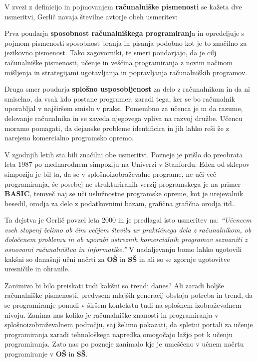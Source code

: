 V zvezi z definicijo in pojmovanjem \textbf{računalniške pismenosti}
se kažeta dve usmeritvi, Gerlič \cite{gerlic_2000} navaja številne
avtorje obeh usmeritev:

Prva poudarja \textbf{sposobnost računalniškega programiranj}a in
opredeljuje s pojmom pismenosti sposobnost branja in pisanja
podobno kot je to značilno za jezikovno pismenost. Tako zagovorniki,
te smeri poudarjajo, da je cilj računalniške pismenosti, učenje in
veščina programiranja z novim načinom mišljenja in strategijami
ugotavljanja in popravljanja računalniških programov.

Druga smer poudarja \textbf{splošno usposobljenost} za delo z
računalnikom in da ni smiselno, da vsak kdo postane programer, zaradi
tega, ker se bo računalnik uporabljal v najširšem smislu v
praksi. Pomembno za učenca je m da razume, delovanje računalnika in se
zaveda njegovega vpliva na razvoj družbe. Učencu moramo pomagati, da
dejanske probleme identificira in jih lahko reši že z narejeno
komercialno programsko opremo.

V zgodnjih letih sta bili značilni obe usmeritvi. Pozneje je prišlo do
preobrata leta 1987 po mednarodnem simpoziju na Univerzi v
Stanfordu. Eden od sklepov simpozija je bil ta, da se v
splošnoizobraževalne programe, ne uči več programiranja, še posebej ne
strukturiranih verzij programskega je na primer \textbf{BASIC}, temveč
naj se uči uslužnostne programske opreme, kot je urejevalnik besedil,
orodja za delo z podatkovnimi bazam, grafična grafična orodja itd..



Ta dejstva je Gerlič \cite{gerlic_2000} povzel leta 2000 in je
predlagal isto usmeritev na: \emph{``Učencem vseh stopenj želimo ob
  čim večjem številu ur praktičnega dela z računalnikom, ob določenem
  problemu in ob uporabi ustreznih komercialnih programov seznaniti z
  osnovami računalništva in informatike.''} V nadaljevanju bomo lahko
ugotovili kakšni so današnji učni načrti za \textbf{OŠ} in \textbf{SŠ}
in ali so se zgornje ugotovitve uresničile in ohranile.

Zanimivo bi bilo preiskati tudi kakšni so trendi danes? Ali zaradi
boljše računalniške pismenosti, predvsem mlajših generacij obstaja
potreba in trend, da se programiranje ponudi v širšem kontekstu tudi
na splošnem izobraževalnem nivoju.  Zanima nas koliko je računalniške
znanosti in programiranja v splošnoizobraževalnem področju, saj želimo
pokazati, da spletni portali za učenje programiranja zaradi
tehnološkega napredka omogočajo lažjo pot k učenju programiranja. Zato
nas po pozneje zanimalo kje je umeščeno v učnem načrtu programiranje v
\textbf{OŠ} in \textbf{SŠ}.


